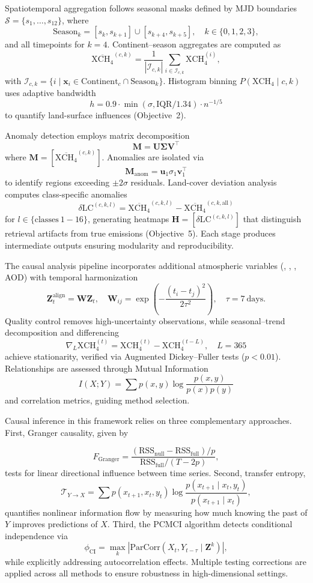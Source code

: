 Spatiotemporal aggregation follows seasonal masks defined by MJD boundaries $\mathcal{S} = \{s_1, \dots, s_{12}\}$, where
\[
	\mathrm{Season}_k = [s_k, s_{k+1}] \cup [s_{k+4}, s_{k+5}], \quad k \in \{0,1,2,3\},
\]
and all timepoints for $k=4$. Continent–season aggregates are computed as
\[
	\overline{\mathrm{XCH}_4}^{(c,k)} = \frac{1}{|\mathcal{I}_{c,k}|} \sum_{i \in \mathcal{I}_{c,k}} \mathrm{XCH}_4^{(i)},
\]
with $\mathcal{I}_{c,k} = \{ i \mid \mathbf{x}_i \in \mathrm{Continent}_c \cap \mathrm{Season}_k \}$. Histogram binning $P(\mathrm{XCH}_4 \mid c,k)$ uses adaptive bandwidth
\[
	h = 0.9 \cdot \min(\sigma, \mathrm{IQR}/1.34) \cdot n^{-1/5}
\]
to quantify land-surface influences (Objective~2).

Anomaly detection employs matrix decomposition
\[
	\mathbf{M} = \mathbf{U} \mathbf{\Sigma} \mathbf{V}^\top
\]
where $\mathbf{M} = [\overline{\mathrm{XCH}_4}^{(c,k)}]$. Anomalies are isolated via
\[
	\mathbf{M}_{\mathrm{anom}} = \mathbf{u}_1 \sigma_1 \mathbf{v}_1^\top
\]
to identify regions exceeding $\pm 2\sigma$ residuals. Land-cover deviation analysis computes class-specific anomalies
\[
	\delta\mathrm{LC}^{(c,k,l)} = \overline{\mathrm{XCH}_4}^{(c,k,l)} - \overline{\mathrm{XCH}_4}^{(c,k,\mathrm{all})}
\]
for $l \in \{\mathrm{classes\ 1\!-\!16}\}$, generating heatmaps $\mathbf{H} = [\delta\mathrm{LC}^{(c,k,l)}]$ that distinguish retrieval artifacts from true emissions (Objective~5). Each stage produces intermediate outputs ensuring modularity and reproducibility.

The causal analysis pipeline incorporates additional atmospheric variables (, , , AOD) with temporal harmonization
\[
	\mathbf{Z}_t^{\mathrm{align}} = \mathbf{W} \mathbf{Z}_t, \quad \mathbf{W}_{ij} = \exp\!\left( -\frac{(t_i - t_j)^2}{2\tau^2} \right), \quad \tau = 7\ \mathrm{days}.
\]
Quality control removes high-uncertainty observations, while seasonal–trend decomposition and differencing
\[
	\nabla_L \mathrm{XCH}_4^{(t)} = \mathrm{XCH}_4^{(t)} - \mathrm{XCH}_4^{(t-L)}, \quad L=365
\]
achieve stationarity, verified via Augmented Dickey–Fuller tests ($p<0.01$). Relationships are assessed through Mutual Information
\[
	I(X;Y) = \sum p(x,y) \log \frac{p(x,y)}{p(x)p(y)}
\]
and correlation metrics, guiding method selection.

Causal inference in this framework relies on three complementary approaches. First, Granger causality, given by

\[
	F_{\mathrm{Granger}} = \frac{(\mathrm{RSS}_{\mathrm{null}} - \mathrm{RSS}_{\mathrm{full}})/p}{\mathrm{RSS}_{\mathrm{full}}/(T - 2p)},
\]
tests for linear directional influence between time series. Second, transfer entropy,
\[
	\mathcal{T}_{Y \to X} = \sum p(x_{t+1},x_t,y_t) \log \frac{p(x_{t+1} \mid x_t, y_t)}{p(x_{t+1} \mid x_t)},
\]
quantifies nonlinear information flow by measuring how much knowing the past of $Y$ improves predictions of $X$. Third, the PCMCI algorithm detects conditional independence via
\[
	\phi_{\mathrm{CI}} = \max_k |\mathrm{ParCorr}(X_t, Y_{t-\tau} \mid \mathbf{Z}^k)|,
\]
while explicitly addressing autocorrelation effects. Multiple testing corrections are applied across all methods to ensure robustness in high-dimensional settings.

